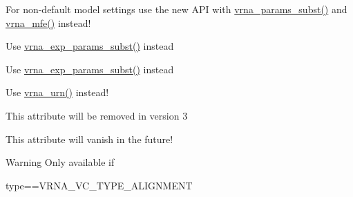 \begin{DoxyRefList}
\item[\label{deprecated__deprecated000068}%
\hypertarget{deprecated__deprecated000068}{}%
global\+Scope$>$ Global \hyperlink{group__mfe__fold__single_gae66dc422efb8f5d56717d92d6002a9f8}{update\+\_\+fold\+\_\+params\+\_\+par} (vrna\+\_\+param\+\_\+t $\ast$parameters)]For non-\/default model settings use the new A\+P\+I with \hyperlink{group__energy__parameters_ga5d1909208f7ea3baa98b75afaa1f62ca}{vrna\+\_\+params\+\_\+subst()} and \hyperlink{group__mfe__fold_gabd3b147371ccf25c577f88bbbaf159fd}{vrna\+\_\+mfe()} instead! 
\item[\label{deprecated__deprecated000098}%
\hypertarget{deprecated__deprecated000098}{}%
global\+Scope$>$ Global \hyperlink{group__pf__fold_ga384e927890f9c034ff09fa66da102d28}{update\+\_\+pf\+\_\+params} (int length)]Use \hyperlink{group__energy__parameters_ga8e7ac4fab3b0cc03afbc134eaafb3525}{vrna\+\_\+exp\+\_\+params\+\_\+subst()} instead


\item[\label{deprecated__deprecated000099}%
\hypertarget{deprecated__deprecated000099}{}%
global\+Scope$>$ Global \hyperlink{group__pf__fold_gaafe2d1b21f5418b123b088aa395e827d}{update\+\_\+pf\+\_\+params\+\_\+par} (int length, vrna\+\_\+exp\+\_\+param\+\_\+t $\ast$parameters)]Use \hyperlink{group__energy__parameters_ga8e7ac4fab3b0cc03afbc134eaafb3525}{vrna\+\_\+exp\+\_\+params\+\_\+subst()} instead


\item[\label{deprecated__deprecated000153}%
\hypertarget{deprecated__deprecated000153}{}%
global\+Scope$>$ Global \hyperlink{utils_8h_aaa328491c84996e445d027fde9800f2e}{urn} (void)]Use \hyperlink{group__utils_ga384e256ebb295d04a14426179db0dd6e}{vrna\+\_\+urn()} instead!  
\item[\label{deprecated__deprecated000092}%
\hypertarget{deprecated__deprecated000092}{}%
Global \hyperlink{group__energy__parameters_a378d5bcf2bae1f3ec84c912c7d3908d2}{vrna\+\_\+exp\+\_\+param\+\_\+s\+:\+:id} ]This attribute will be removed in version 3  
\item[\label{deprecated__deprecated000048}%
\hypertarget{deprecated__deprecated000048}{}%
Global \hyperlink{group__fold__compound_abf5e82d14649b6179ae60ed7da6e4fc0}{vrna\+\_\+fc\+\_\+s\+:\+:pscore\+\_\+pf\+\_\+compat} ]This attribute will vanish in the future! \begin{DoxyWarning}{Warning}
Only available if\begin{DoxyVerb}type==VRNA_VC_TYPE_ALIGNMENT \end{DoxyVerb}
  

\end{DoxyWarning}
\end{DoxyRefList}
